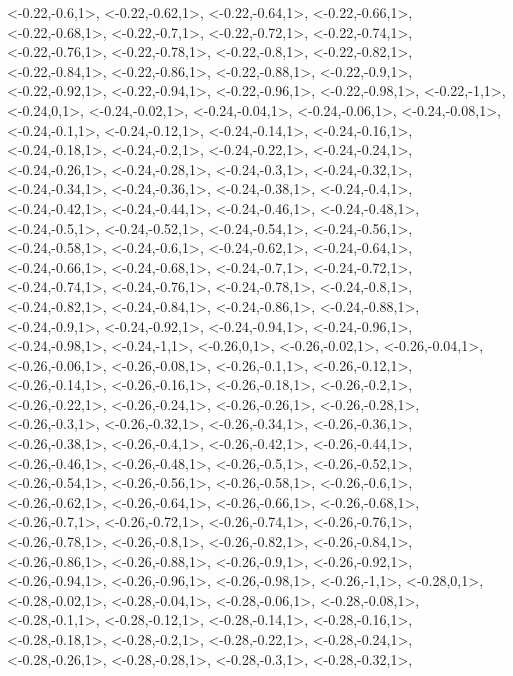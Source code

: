 \documentclass[a4paper,10pt]{article}
\begin{document}
\begin{eulernotebook}
\begin{euleroutput}
  <-0.22,-0.6,1>,
  <-0.22,-0.62,1>,
  <-0.22,-0.64,1>,
  <-0.22,-0.66,1>,
  <-0.22,-0.68,1>,
  <-0.22,-0.7,1>,
  <-0.22,-0.72,1>,
  <-0.22,-0.74,1>,
  <-0.22,-0.76,1>,
  <-0.22,-0.78,1>,
  <-0.22,-0.8,1>,
  <-0.22,-0.82,1>,
  <-0.22,-0.84,1>,
  <-0.22,-0.86,1>,
  <-0.22,-0.88,1>,
  <-0.22,-0.9,1>,
  <-0.22,-0.92,1>,
  <-0.22,-0.94,1>,
  <-0.22,-0.96,1>,
  <-0.22,-0.98,1>,
  <-0.22,-1,1>,
  <-0.24,0,1>,
  <-0.24,-0.02,1>,
  <-0.24,-0.04,1>,
  <-0.24,-0.06,1>,
  <-0.24,-0.08,1>,
  <-0.24,-0.1,1>,
  <-0.24,-0.12,1>,
  <-0.24,-0.14,1>,
  <-0.24,-0.16,1>,
  <-0.24,-0.18,1>,
  <-0.24,-0.2,1>,
  <-0.24,-0.22,1>,
  <-0.24,-0.24,1>,
  <-0.24,-0.26,1>,
  <-0.24,-0.28,1>,
  <-0.24,-0.3,1>,
  <-0.24,-0.32,1>,
  <-0.24,-0.34,1>,
  <-0.24,-0.36,1>,
  <-0.24,-0.38,1>,
  <-0.24,-0.4,1>,
  <-0.24,-0.42,1>,
  <-0.24,-0.44,1>,
  <-0.24,-0.46,1>,
  <-0.24,-0.48,1>,
  <-0.24,-0.5,1>,
  <-0.24,-0.52,1>,
  <-0.24,-0.54,1>,
  <-0.24,-0.56,1>,
  <-0.24,-0.58,1>,
  <-0.24,-0.6,1>,
  <-0.24,-0.62,1>,
  <-0.24,-0.64,1>,
  <-0.24,-0.66,1>,
  <-0.24,-0.68,1>,
  <-0.24,-0.7,1>,
  <-0.24,-0.72,1>,
  <-0.24,-0.74,1>,
  <-0.24,-0.76,1>,
  <-0.24,-0.78,1>,
  <-0.24,-0.8,1>,
  <-0.24,-0.82,1>,
  <-0.24,-0.84,1>,
  <-0.24,-0.86,1>,
  <-0.24,-0.88,1>,
  <-0.24,-0.9,1>,
  <-0.24,-0.92,1>,
  <-0.24,-0.94,1>,
  <-0.24,-0.96,1>,
  <-0.24,-0.98,1>,
  <-0.24,-1,1>,
  <-0.26,0,1>,
  <-0.26,-0.02,1>,
  <-0.26,-0.04,1>,
  <-0.26,-0.06,1>,
  <-0.26,-0.08,1>,
  <-0.26,-0.1,1>,
  <-0.26,-0.12,1>,
  <-0.26,-0.14,1>,
  <-0.26,-0.16,1>,
  <-0.26,-0.18,1>,
  <-0.26,-0.2,1>,
  <-0.26,-0.22,1>,
  <-0.26,-0.24,1>,
  <-0.26,-0.26,1>,
  <-0.26,-0.28,1>,
  <-0.26,-0.3,1>,
  <-0.26,-0.32,1>,
  <-0.26,-0.34,1>,
  <-0.26,-0.36,1>,
  <-0.26,-0.38,1>,
  <-0.26,-0.4,1>,
  <-0.26,-0.42,1>,
  <-0.26,-0.44,1>,
  <-0.26,-0.46,1>,
  <-0.26,-0.48,1>,
  <-0.26,-0.5,1>,
  <-0.26,-0.52,1>,
  <-0.26,-0.54,1>,
  <-0.26,-0.56,1>,
  <-0.26,-0.58,1>,
  <-0.26,-0.6,1>,
  <-0.26,-0.62,1>,
  <-0.26,-0.64,1>,
  <-0.26,-0.66,1>,
  <-0.26,-0.68,1>,
  <-0.26,-0.7,1>,
  <-0.26,-0.72,1>,
  <-0.26,-0.74,1>,
  <-0.26,-0.76,1>,
  <-0.26,-0.78,1>,
  <-0.26,-0.8,1>,
  <-0.26,-0.82,1>,
  <-0.26,-0.84,1>,
  <-0.26,-0.86,1>,
  <-0.26,-0.88,1>,
  <-0.26,-0.9,1>,
  <-0.26,-0.92,1>,
  <-0.26,-0.94,1>,
  <-0.26,-0.96,1>,
  <-0.26,-0.98,1>,
  <-0.26,-1,1>,
  <-0.28,0,1>,
  <-0.28,-0.02,1>,
  <-0.28,-0.04,1>,
  <-0.28,-0.06,1>,
  <-0.28,-0.08,1>,
  <-0.28,-0.1,1>,
  <-0.28,-0.12,1>,
  <-0.28,-0.14,1>,
  <-0.28,-0.16,1>,
  <-0.28,-0.18,1>,
  <-0.28,-0.2,1>,
  <-0.28,-0.22,1>,
  <-0.28,-0.24,1>,
  <-0.28,-0.26,1>,
  <-0.28,-0.28,1>,
  <-0.28,-0.3,1>,
  <-0.28,-0.32,1>,

\end{euleroutput}
\end{eulernotebook}
\end{document}
